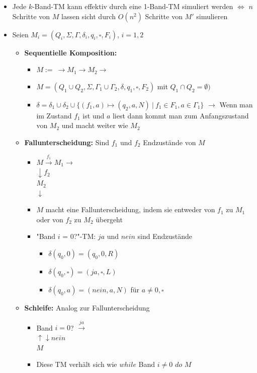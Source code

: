 \documentclass[ieeetran]{article}
\begin{document}
\begin{itemize}
	\item Jede $k$-Band-TM kann effektiv durch eine 1-Band-TM simuliert werden $\Leftrightarrow$ $n$ Schritte von $M$ lassen sicht durch $O(n^2)$ Schritte von $M'$  simulieren
	\item Seien $M_i = (Q_i,\Sigma, \Gamma, \delta_i,q_i,\square,F_i)$, $i = 1,2$
		\begin{itemize}
		  \item \textbf{Sequentielle Komposition:} 
			\begin{itemize}
			  \item $M:= \ \rightarrow M_1 \rightarrow M_2 \rightarrow$
			  \item $M = (Q_1 \cup Q_2, \Sigma, \Gamma_1 \cup \Gamma_2,\delta,q_1, \square,F_2)$ mit $Q_1 \cap Q_2 = \emptyset)$
			  \item $\delta = \delta_1 \cup \delta_2 \cup \{(f_1,a) \mapsto  (q_2,a,N) \ | \ f_1 \in F_1, a \in \Gamma_1\}$ $\rightarrow$ Wenn man im Zustand $f_1$ ist und $a$ liest dann kommt man zum Anfangszustand von $M_2$ und macht weiter wie $M_2$ 
		\end{itemize}
	
		\item \textbf{Fallunterscheidung:} Sind $f_1$ und $f_2$ Endzustände von $M$
		\begin{itemize}
			\item $M \xrightarrow{\text{$f_1$}} M_1 \rightarrow$
	\\ $\downarrow f_2$
\\ $M_2$
\\$\downarrow$
\item $M$ macht eine Fallunterscheidung, indem sie entweder von $f_1$ zu $M_1$ oder von $f_2$ zu $M_2$ übergeht
\item "Band $i$ = 0?"-TM: $ja$ und $nein$ sind Endzustände
	\begin{itemize}
	  \item $\delta(q_0,0) = (q_0,0,R)$
		\item $\delta(q_0, \square) = (ja,\square,L)$
		\item $\delta(q_0, a) = (nein,a,N)$ für $a \neq0, \square$
  
  \end{itemize}
		\end{itemize}

  \item \textbf{Schleife:} Analog zur Fallunterscheidung
	  \begin{itemize}
	    \item Band $i=0$? $\xrightarrow{\text{$ja$}}$
		    \\  $\uparrow \downarrow nein$
		    \\ $M$
	\item Diese TM verhält sich wie $while$ Band $i \neq 0$ $do$ $M$
	  \end{itemize}
			\end{itemize}
\end{itemize}
\end{document}
